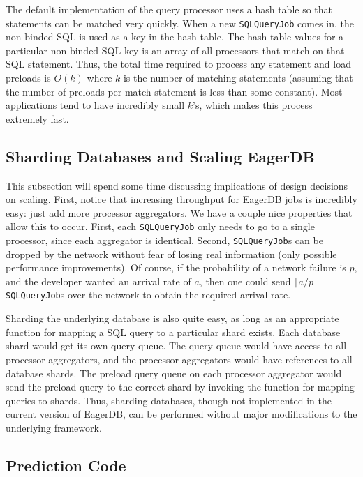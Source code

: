 \documentclass[12pt]{article}
\begin{document}
The default implementation of the query processor uses a hash table so that statements can be matched very quickly. When a new \texttt{SQLQueryJob} comes in, the non-binded SQL is used as a key in the hash table. The hash table values for a particular non-binded SQL key is an array of all processors that match on that SQL statement. Thus, the total time required to process any statement and load preloads is $O(k)$ where $k$ is the number of matching statements (assuming that the number of preloads per match statement is less than some constant). Most applications tend to have incredibly small $k$'s, which makes this process extremely fast.

\subsection{Sharding Databases and Scaling EagerDB}

This subsection will spend some time discussing implications of design decisions on scaling. First, notice that increasing throughput for EagerDB jobs is incredibly easy: just add more processor aggregators. We have a couple nice properties that allow this to occur. First, each \texttt{SQLQueryJob} only needs to go to a single processor, since each aggregator is identical. Second, \texttt{SQLQueryJob}s can be dropped by the network without fear of losing real information (only possible performance improvements). Of course, if the probability of a network failure is $p$, and the developer wanted an arrival rate of $a$, then one could send $\lceil a/p \rceil$ \texttt{SQLQueryJob}s over the network to obtain the required arrival rate.

Sharding the underlying database is also quite easy, as long as an appropriate function for mapping a SQL query to a particular shard exists. Each database shard would get its own query queue. The query queue would have access to all processor aggregators, and the processor aggregators would have references to all database shards. The preload query queue on each processor aggregator would send the preload query to the correct shard by invoking the function for mapping queries to shards. Thus, sharding databases, though not implemented in the current version of EagerDB, can be performed without major modifications to the underlying framework.

\subsection{Prediction Code}
\end{document}
